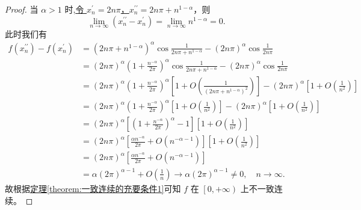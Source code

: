 \documentclass[../../main.tex]{subfiles}%
\begin{document}
\begin{proof}
当 $\alpha > 1$ 时,\hyperlink{找两个数列的方式123}{令 $x_{n}^{\prime} = 2n\pi$，$x_{n}^{\prime\prime} = 2n\pi + n^{1 - \alpha}$}，则
\[
\lim_{n \rightarrow \infty} \left( x_{n}^{\prime\prime} - x_{n}^{\prime} \right) = \lim_{n \rightarrow \infty} n^{1 - \alpha} = 0.
\]
此时我们有
\begin{align*}
f\left( x_{n}^{\prime\prime} \right) - f\left( x_{n}^{\prime} \right) &= \left( 2n\pi + n^{1 - \alpha} \right)^{\alpha} \cos \frac{1}{2n\pi + n^{1 - \alpha}} - \left( 2n\pi \right)^{\alpha} \cos \frac{1}{2n\pi} \\
&= \left( 2n\pi \right)^{\alpha} \left( 1 + \frac{n^{-\alpha}}{2\pi} \right)^{\alpha} \cos \frac{1}{2n\pi + n^{1 - \alpha}} - \left( 2n\pi \right)^{\alpha} \cos \frac{1}{2n\pi} \\
&= \left( 2n\pi \right)^{\alpha} \left( 1 + \frac{n^{-\alpha}}{2\pi} \right)^{\alpha} \left[ 1 + O\left( \frac{1}{\left( 2n\pi + n^{1 - \alpha} \right)^2} \right) \right] - \left( 2n\pi \right)^{\alpha} \left[ 1 + O\left( \frac{1}{n^2} \right) \right] \\
&= \left( 2n\pi \right)^{\alpha} \left( 1 + \frac{n^{-\alpha}}{2\pi} \right)^{\alpha} \left[ 1 + O\left( \frac{1}{n^2} \right) \right] - \left( 2n\pi \right)^{\alpha} \left[ 1 + O\left( \frac{1}{n^2} \right) \right] \\
&= \left( 2n\pi \right)^{\alpha} \left[ \left( 1 + \frac{n^{-\alpha}}{2\pi} \right)^{\alpha} - 1 \right] \left[ 1 + O\left( \frac{1}{n^2} \right) \right] \\
&= \left( 2n\pi \right)^{\alpha} \left[ \frac{\alpha n^{-\alpha}}{2\pi} + O\left( n^{-\alpha - 1} \right) \right] \left[ 1 + O\left( \frac{1}{n^2} \right) \right] \\
&= \left( 2n\pi \right)^{\alpha} \left[ \frac{\alpha n^{-\alpha}}{2\pi} + O\left( n^{-\alpha - 1} \right) \right] \\
&= \alpha \left( 2\pi \right)^{\alpha - 1} + O\left( \frac{1}{n} \right) \rightarrow \alpha \left( 2\pi \right)^{\alpha - 1} \ne 0, \quad n \rightarrow \infty.
\end{align*}
故根据\hyperref[theorem:一致连续的充要条件1]{定理\ref{theorem:一致连续的充要条件1}}可知 $f$ 在 $\left[ 0, +\infty \right)$ 上不一致连续。
\end{proof}
\end{document}
